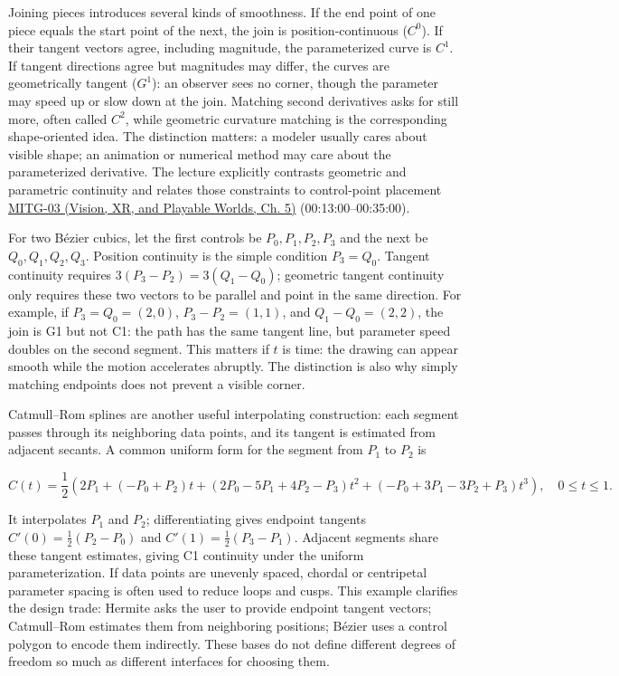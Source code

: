 Joining pieces introduces several kinds of smoothness. If the end point of one piece equals the start point of the next, the join is position-continuous (\(C^0\)). If their tangent vectors agree, including magnitude, the parameterized curve is \(C^1\). If tangent directions agree but magnitudes may differ, the curves are geometrically tangent (\(G^1\)): an observer sees no corner, though the parameter may speed up or slow down at the join. Matching second derivatives asks for still more, often called \(C^2\), while geometric curvature matching is the corresponding shape-oriented idea. The distinction matters: a modeler usually cares about visible shape; an animation or numerical method may care about the parameterized derivative. The lecture explicitly contrasts geometric and parametric continuity and relates those constraints to control-point placement \href{../07-Vision-XR-and-Playable-Worlds/main.pdf\#nameddest=04-visual-computing-ii-ch036-mitg-03---curves-and-surfaces}{MITG-03 (Vision, XR, and Playable Worlds, Ch. 5)} (00:13:00--00:35:00).

For two Bézier cubics, let the first controls be \(P_0,P_1,P_2,P_3\) and the next be \(Q_0,Q_1,Q_2,Q_3\). Position continuity is the simple condition \(P_3=Q_0\). Tangent continuity requires \(3(P_3-P_2)=3(Q_1-Q_0)\); geometric tangent continuity only requires these two vectors to be parallel and point in the same direction. For example, if \(P_3=Q_0=(2,0)\), \(P_3-P_2=(1,1)\), and \(Q_1-Q_0=(2,2)\), the join is G1 but not C1: the path has the same tangent line, but parameter speed doubles on the second segment. This matters if \(t\) is time: the drawing can appear smooth while the motion accelerates abruptly. The distinction is also why simply matching endpoints does not prevent a visible corner.

Catmull--Rom splines are another useful interpolating construction: each segment passes through its neighboring data points, and its tangent is estimated from adjacent secants. A common uniform form for the segment from \(P_1\) to \(P_2\) is

\[
C(t)=\frac12\left(2P_1+(-P_0+P_2)t+(2P_0-5P_1+4P_2-P_3)t^2+(-P_0+3P_1-3P_2+P_3)t^3\right),\quad 0\le t\le1.
\]

It interpolates \(P_1\) and \(P_2\); differentiating gives endpoint tangents \(C'(0)=\frac12(P_2-P_0)\) and \(C'(1)=\frac12(P_3-P_1)\). Adjacent segments share these tangent estimates, giving C1 continuity under the uniform parameterization. If data points are unevenly spaced, chordal or centripetal parameter spacing is often used to reduce loops and cusps. This example clarifies the design trade: Hermite asks the user to provide endpoint tangent vectors; Catmull--Rom estimates them from neighboring positions; Bézier uses a control polygon to encode them indirectly. These bases do not define different degrees of freedom so much as different interfaces for choosing them.

